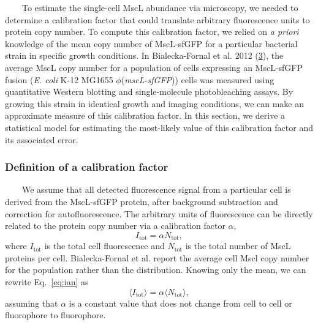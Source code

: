 ~~~~To
estimate
the
single-cell
MscL
abundance
via
microscopy,
we
needed
to
determine
a
calibration
factor
that
could
translate
arbitrary
fluorescence
units
to
protein
copy
number.
To
compute
this
calibration
factor,
we
relied
on
\emph{a
priori}
knowledge
of the
mean
copy
number
of
MscL-sfGFP
for a
particular
bacterial
strain
in
specific
growth
conditions.
In
Bialecka-Fornal
et al.
2012
(\protect\hyperlink{ref-bialecka-fornal2012}{3}),
the
average
MscL
copy
number
for a
population
of
cells
expressing
an
MscL-sfGFP
fusion
(\emph{E.
coli}
K-12
MG1655
\(\phi\)(\emph{mscL-sfGFP}))
cells
was
measured
using
quantitative
Western
blotting
and
single-molecule
photobleaching
assays.
By
growing
this
strain
in
identical
growth
and
imaging
conditions,
we can
make
an
approximate
measure
of
this
calibration
factor.
In
this
section,
we
derive
a
statistical
model
for
estimating
the
most-likely
value
of
this
calibration
factor
and
its
associated
error.

\subsubsection{Definition
of a
calibration
factor}\label{definition-of-a-calibration-factor}

~~~~We
assume
that
all
detected
fluorescence
signal
from a
particular
cell
is
derived
from
the
MscL-sfGFP
protein,
after
background
subtraction
and
correction
for
autofluorescence.
The
arbitrary
units
of
fluorescence
can be
directly
related
to the
protein
copy
number
via a
calibration
factor
\(\alpha\),
\begin{equation}
I_\text{tot} = \alpha N_\text{tot},
\label{eq:ian}\end{equation}
where
\(I_\text{tot}\)
is the
total
cell
fluorescence
and
\(N_\text{tot}\)
is the
total
number
of
MscL
proteins
per
cell.
Bialecka-Fornal
et al.
report
the
average
cell
Mscl
copy
number
for
the
population
rather
than
the
distribution.
Knowing
only
the
mean,
we can
rewrite
Eq.~\ref{eq:ian}
as
\begin{equation}
\langle I_\text{tot}\rangle = \alpha \langle N_\text{tot} \rangle,
\label{eq:avg_ian}\end{equation}
assuming
that
\(\alpha\)
is a
constant
value
that
does
not
change
from
cell
to
cell
or
fluorophore
to
fluorophore.

